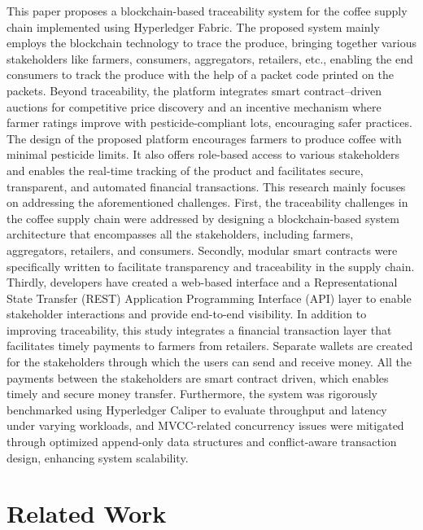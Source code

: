 \documentclass[12pt]{article}
\begin{document}
	This paper proposes a blockchain-based traceability system for the coffee supply chain implemented using Hyperledger Fabric. The proposed system mainly employs the blockchain technology to trace the produce, bringing together various stakeholders like farmers, consumers, aggregators, retailers, etc., enabling the end consumers to track the produce with the help of a packet code printed on the packets. Beyond traceability, the platform integrates smart contract–driven auctions for competitive price discovery and an incentive mechanism where farmer ratings improve with pesticide-compliant lots, encouraging safer practices. The design of the proposed platform encourages farmers to produce coffee with minimal pesticide limits. It also offers role-based access to various stakeholders and enables the real-time tracking of the product and facilitates secure, transparent, and automated financial transactions. This research mainly focuses on addressing the aforementioned challenges. First, the traceability challenges in the coffee supply chain were addressed by designing a blockchain-based system architecture that encompasses all the stakeholders, including farmers, aggregators, retailers, and consumers. Secondly, modular smart contracts were specifically written to facilitate transparency and traceability in the supply chain. Thirdly, developers have created a web-based interface and a Representational State Transfer (REST) Application Programming Interface (API) layer to enable stakeholder interactions and provide end-to-end visibility. In addition to improving traceability, this study integrates a financial transaction layer that facilitates timely payments to farmers from retailers. Separate wallets are created for the stakeholders through which the users can send and receive money. All the payments between the stakeholders are smart contract driven, which enables timely and secure money transfer. Furthermore, the system was rigorously benchmarked using Hyperledger Caliper to evaluate throughput and latency under varying workloads, and MVCC-related concurrency issues were mitigated through optimized append-only data structures and conflict-aware transaction design, enhancing system scalability.
	
	
	\section{Related Work}
	
\end{document}
